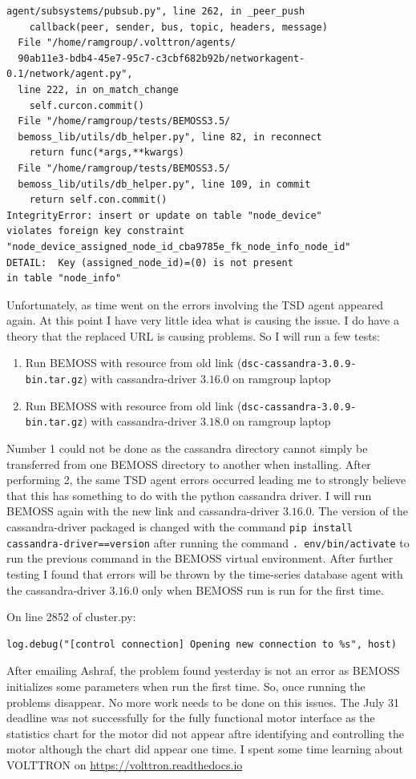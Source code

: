 \documentclass[fontsize=11pt, %
                             paper=letter, %
                             twoside, %
                             captions=tableheading,
                             index=totoc,
                             hyperref]{labbook}
\begin{document}
\begin{addmargin}[0cm]{0cm}
\begin{Verbatim}[tabsize=4]
  agent/subsystems/pubsub.py", line 262, in _peer_push
    callback(peer, sender, bus, topic, headers, message)
  File "/home/ramgroup/.volttron/agents/
  90ab11e3-bdb4-45e7-95c7-c3cbf682b92b/networkagent-0.1/network/agent.py", 
  line 222, in on_match_change
    self.curcon.commit()
  File "/home/ramgroup/tests/BEMOSS3.5/
  bemoss_lib/utils/db_helper.py", line 82, in reconnect
    return func(*args,**kwargs)
  File "/home/ramgroup/tests/BEMOSS3.5/
  bemoss_lib/utils/db_helper.py", line 109, in commit
    return self.con.commit()
IntegrityError: insert or update on table "node_device" 
violates foreign key constraint 
"node_device_assigned_node_id_cba9785e_fk_node_info_node_id"
DETAIL:  Key (assigned_node_id)=(0) is not present 
in table "node_info"
\end{Verbatim}
Unfortunately, as time went on the errors involving the TSD agent appeared again. At this point I have very little idea what is causing the issue. I do have a theory that the replaced URL is causing problems. So I will run a few tests:
\begin{enumerate}
\item Run BEMOSS with resource from old link (\texttt{dsc-cassandra-3.0.9-bin.tar.gz}) with cassandra-driver $3.16.0$ on ramgroup laptop
\item Run BEMOSS with resource from old link (\texttt{dsc-cassandra-3.0.9-bin.tar.gz}) with cassandra-driver $3.18.0$ on ramgroup laptop
\end{enumerate}
Number 1 could not be done as the cassandra directory cannot simply be transferred from one BEMOSS directory to another when installing. After performing 2, the same TSD agent errors occurred leading me to strongly believe that this has something to do with the python cassandra driver. I will run BEMOSS again with the new link and cassandra-driver $3.16.0$. The version of the cassandra-driver packaged is changed with the command \texttt{pip install cassandra-driver==version} after running the command \texttt{. env/bin/activate} to run the previous command in the BEMOSS virtual environment. After further testing I found that errors will be thrown by the time-series database agent with the cassandra-driver $3.16.0$ only when BEMOSS run is run for the first time.

On line 2852 of cluster.py:
\begin{verbatim}
log.debug("[control connection] Opening new connection to %s", host)
\end{verbatim}
After emailing Ashraf, the problem found yesterday is not an error as BEMOSS initializes some parameters when run the first time. So, once running the problems disappear. No more work needs to be done on this issues. The July 31 deadline was not successfully for the fully functional motor interface as the statistics chart for the motor did not appear aftre identifying and controlling the motor although the chart did appear one time.
\bigbreak\noindent
I spent some time learning about VOLTTRON on \url{https://volttron.readthedocs.io}


\end{addmargin}
\end{document}
